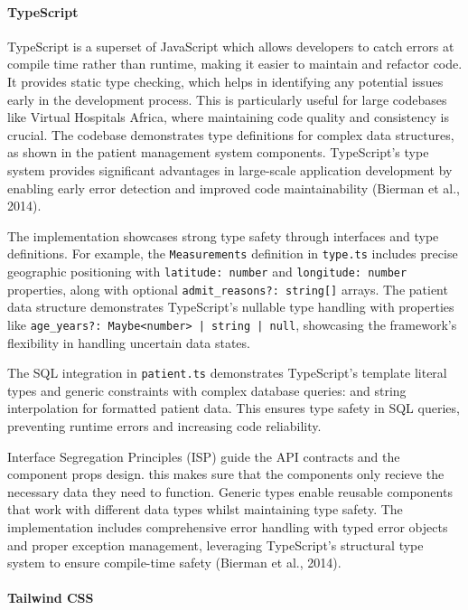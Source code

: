 \paragraph{TypeScript}\mbox{}

TypeScript is a superset of JavaScript which allows developers to catch errors at compile time rather than runtime, making it easier to maintain and refactor code. It provides static type checking, which helps in identifying any potential issues early in the development process. This is particularly useful for large codebases like Virtual Hospitals Africa, where maintaining code quality and consistency is crucial. The codebase demonstrates type definitions for complex data structures, as shown in the patient management system components. TypeScript's type system provides significant advantages in large-scale application development by enabling early error detection and improved code maintainability (Bierman et al., 2014).

The implementation showcases strong type safety through interfaces and type definitions. For example, the \texttt{Measurements} definition in \texttt{type.ts} includes precise geographic positioning with \texttt{latitude: number} and \texttt{longitude: number} properties, along with optional \texttt{admit\_reasons?: string[]} arrays. The patient data structure demonstrates TypeScript's nullable type handling with properties like \texttt{age\_years?: Maybe<number> | string | null}, showcasing the framework's flexibility in handling uncertain data states.

The SQL integration in \texttt{patient.ts} demonstrates TypeScript's template literal types and generic constraints with complex database queries: \texttt{} and string interpolation for formatted patient data. This ensures type safety in SQL queries, preventing runtime errors and increasing code reliability.

Interface Segregation Principles (ISP) guide the API contracts and the component props  design. this makes sure that the components only recieve the necessary data they need to function. Generic types enable reusable components that work with different data types whilst maintaining type safety. The implementation includes comprehensive error handling with typed error objects and proper exception management, leveraging TypeScript's structural type system to ensure compile-time safety (Bierman et al., 2014).

\paragraph{Tailwind CSS}\mbox{}

